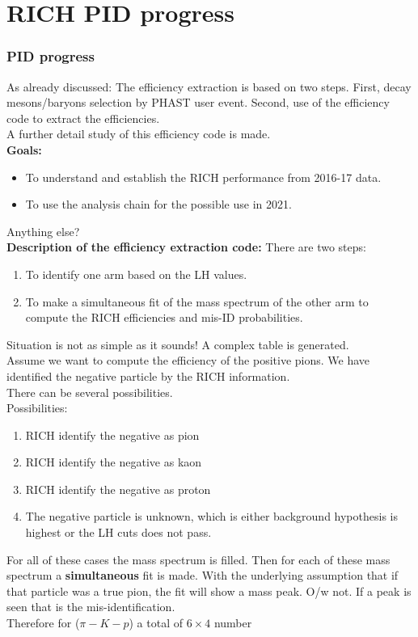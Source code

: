 \documentclass{beamer}
\begin{document}
\section{RICH PID progress}
\begin{frame}[allowframebreaks]
    \frametitle{PID progress}
    As already discussed:
    The efficiency extraction is based on two steps. First, decay mesons/baryons selection by PHAST user event. Second, use of the efficiency code to extract the efficiencies.\\
          A further detail study of this efficiency code is made.\\
    \textbf{Goals:}
          \begin{itemize}
              \item To understand and establish the RICH performance from 2016-17 data. 
              \item To use the analysis chain for the possible use in 2021.
          \end{itemize}
            Anything else?\\
            \framebreak
            \textbf{Description of the efficiency extraction code:} 
                \newline There are two steps:
                \begin{enumerate}
                    \item To identify one arm based on the LH values.
                    \item To make a simultaneous fit of the mass spectrum of the other arm to compute the RICH efficiencies and mis-ID probabilities. 
                \end{enumerate}
    Situation is not as simple as it sounds! A complex table is generated.\\
    Assume we want to compute the efficiency of the positive pions. We have identified the negative particle by the RICH information.\\ There can be several possibilities.\\
        \framebreak
        Possibilities:
    \begin{enumerate}
        \item RICH identify the negative as pion
        \item RICH identify the negative as kaon
        \item RICH identify the negative as proton
        \item The negative particle is unknown, which is either background hypothesis is highest or the LH cuts does not pass.
    \end{enumerate}
        For all of these cases the mass spectrum is filled. Then for each of these mass spectrum a \textbf{simultaneous} fit is made. With the underlying assumption that if that particle was a true pion, the fit will show a mass peak. O/w not. If a peak is seen that is the mis-identification.\\
        Therefore for ($\pi-K-p$) a total of $6\times4$ number 
\end{frame}
\end{document}
